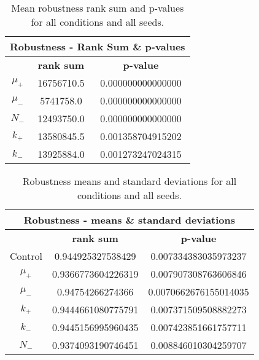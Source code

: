 \begin{table}
	\begin{tabular}{|c|c|c|}
		\hline
		\multicolumn{3}{c}{\Large \textbf{Robustness - Rank Sum \& p-values}} \\
		\hline
		& \textbf{rank sum} & \textbf{p-value} \\
		\hline
		$\mu_+$ & 16756710.5 & 0.000000000000000 \\
		\hline
		$\mu_-$ & 5741758.0 & 0.000000000000000 \\
		\hline
		$N_-$ & 12493750.0 & 0.000000000000000 \\
		\hline
		$k_+$ & 13580845.5 &	0.001358704915202 \\
		\hline
		$k_-$ & 13925884.0 & 0.001273247024315 \\
		\hline
	\end{tabular}
	\caption[Robustness rank sum \& p-values]{Mean robustness rank sum and p-values for all conditions and all seeds.}
	\label{table:rank_sum_p-values}
\end{table}
\begin{table}[H]
	\begin{tabular}{|c|c|c|}
		\hline
		\multicolumn{3}{c}{\Large \textbf{Robustness - means \& standard deviations}} \\
		\hline
		& \textbf{rank sum} & \textbf{p-value} \\
		\hline
		Control & 0.944925327538429	& 0.007334383035973237 \\
		\hline
		$\mu_+$ & 0.9366773604226319 & 0.007907308763606846 \\
		\hline
		$\mu_-$ &	0.94754266274366 & 0.0070662676155014035 \\
		\hline
		$k_+$ & 0.9444661080775791 & 0.007371509508882273 \\
		\hline
		$k_-$ & 0.9445156995960435	& 0.007423851661757711 \\
		\hline
		$N_-$ & 0.9374093190746451 & 0.008846010304259707 \\
		\hline
	\end{tabular}
	\caption[Robustness means and standard deviations]{Robustness means and standard deviations for all conditions and all seeds.}
	\label{table:robustness_means_and_std_dev}
\end{table}



